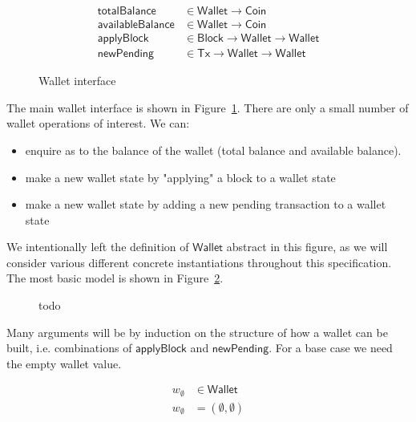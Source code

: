 \documentclass{article}
\begin{document}
\begin{figure}

%
\begin{equation*}
\begin{split}
  \mathsf{totalBalance}
& \in \mathsf{Wallet} \to \mathsf{Coin}
\\
  \mathsf{availableBalance}
& \in \mathsf{Wallet} \to \mathsf{Coin}
\\
  \mathsf{applyBlock}
& \in \mathsf{Block} \to \mathsf{Wallet} \to \mathsf{Wallet}
\\
  \mathsf{newPending}
& \in \mathsf{Tx} \to \mathsf{Wallet} \to \mathsf{Wallet}
\end{split}
\end{equation*}

\caption{\label{fig:wallet_interface}Wallet interface}
\end{figure}

The main wallet interface is shown in Figure~\ref{fig:wallet_interface}. There
are only a small number of wallet operations of interest. We can:
%
\begin{itemize}
\item enquire as to the balance of the wallet (total balance and
      available balance).
\item make a new wallet state by "applying" a block to a wallet state
\item make a new wallet state by adding a new pending transaction to a wallet
      state
\end{itemize}
%
We intentionally left the definition of $\mathsf{Wallet}$ abstract in this
figure, as we will consider various different concrete instantiations throughout
this specification. The most basic model is shown in
Figure~\ref{fig:basic_model}.

\begin{figure}
todo
\caption{\label{fig:basic_model}}
\end{figure}

Many arguments will be by induction on the structure of how a wallet can be
built, i.e. combinations of $\mathsf{applyBlock}$ and $\mathsf{newPending}$.
For a base case we need the empty wallet value.

\begin{equation}
\begin{split}
w_\emptyset & \in \mathsf{Wallet} \\
w_\emptyset & = (\emptyset, \emptyset)
\end{split}
\end{equation}
\end{document}
